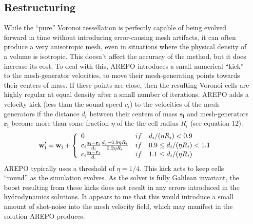 \documentclass[12pt, preprint]{aastex}
\begin{document}
\subsection{Restructuring}
While the ``pure'' Voronoi tessellation is perfectly capable of being evolved
forward in time without introducing error-causing mesh artifacts, it can often
produce a very anisotropic mesh, even in situations where the physical density
of a volume is isotropic. This doesn't affect the accuracy of the method, but it
does increase its cost.  To deal with this, AREPO introduces a small numerical
``kick'' to the mesh-generator velocities, to move their mesh-generating points
towards their centers of mass.  If these points are close, then the resulting
Voronoi cells are highly regular at equal density after a small number of
iterations.  AREPO adds a velocity kick (less than the sound speed $c_i$) to the velocities of the mesh
generators if the distance $d_i$ between their centers of mass $\mathbf{s_i}$
and mesh-generators $\mathbf{r_i}$ become more than some fraction $\eta$ of the the
cell radius $R_i$ (see equation 12).  
\begin{equation}
	\mathbf{w_i'} = \mathbf{w_i}+\left\{
		\begin{array}{l l l}
			0 & if & d_i/(\eta R_i) < 0.9\\
			c_i\frac{\mathbf{s_i-r_i}}{d_i}\frac{d_j-0.9\eta R_i}{0.2\eta R_i} & if & 0.9\leq d_i/(\eta R_i) < 1.1\\
			c_i\frac{\mathbf{s_i-r_i}}{d_i} & if & 1.1\leq d_i/(\eta R_i) \\
	\end{array} \right.
\end{equation}
AREPO typically uses a threshold of $\eta=1/4$. This kick acts to keep cells
``round'' as the simulation evolves.  As the solver is fully Galilean invariant,
the boost resulting from these kicks does not result in any errors introduced in
the hydrodynamics solutions.  It appears to me that this would introduce a small
amount of shot-noise into the mesh velocity field, which may manifest in the
solution AREPO produces.
\end{document}
